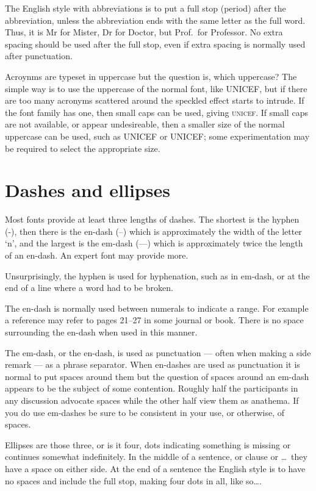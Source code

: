 \documentclass[10pt,letterpaper]{memoir}
\begin{document}
    The English style with abbreviations is to put a full stop (period) after
the abbreviation, unless the abbreviation ends with the same letter as the
full word. Thus, it is Mr for Mister, Dr for Doctor, but Prof.~for Professor.
No extra spacing should be used after the full stop, even if extra
spacing is normally used after punctuation.

    Acroynms are typeset in uppercase but the 
question is, which uppercase?
The simple way is to use the uppercase of the normal font, like UNICEF, but
if there are too many acronyms scattered around the speckled effect starts
to intrude. If the font family has one, then small caps can be used,
giving \textsc{unicef}. If small caps are not available, or appear
undesireable, then a smaller size of the normal uppercase can be used,
such as {\small UNICEF} or {\footnotesize UNICEF}; some experimentation
may be required to select the appropriate size.

\section{Dashes and ellipses}

    Most fonts provide at least three lengths of dashes. The shortest is
the hyphen (-), then there is the en-dash (--) which is approximately the
width of the letter `n', and the largest is the em-dash (---) which is
approximately twice the length of an en-dash. An expert font may provide
more.

   Unsurprisingly, the hyphen is used for hyphenation, such as in em-dash, or
at the end of a line where a word had to be broken.

    The en-dash is normally used between numerals to indicate a range. For
example a reference may refer to pages 21--27 in some journal or book. There
is no space surrounding the en-dash when used in this manner.

    The em-dash, or the en-dash, is used as 
punctuation --- often when making a side 
remark --- as a phrase separator.
 When en-dashes are used as punctuation it is normal to put spaces around them
but the question of spaces around an em-dash appears to be the subject of
some contention. Roughly half the participants in any discussion advocate
spaces while the other half view them as anathema. If you do use em-dashes
be sure to be consistent in your use, or otherwise, of spaces.

    Ellipses are those three, or is it four, 
dots indicating something is
missing or continues somewhat indefinitely. In the middle of a sentence,
or clause or \ldots\ they have a space on either side. At the end of
a sentence the English style is to have no spaces and include the full
stop, making four dots in all, like so\ldots.
\end{document}
